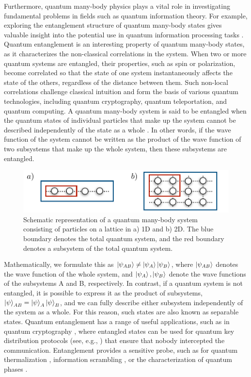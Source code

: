 Furthermore, quantum many-body physics plays a vital role in investigating fundamental problems in fields such as quantum information theory. For example, exploring the entanglement structure of quantum many-body states gives valuable insight into the potential use in quantum information processing tasks \cite{luecke2014, schmied2016, luo2017}. Quantum entanglement is an interesting property of quantum many-body states, as it characterizes the non-classical correlations in the system. When two or more quantum systems are entangled, their properties, such as spin or polarization, become correlated so that the state of one system instantaneously affects the state of the others, regardless of the distance between them. Such non-local correlations challenge classical intuition and form the basis of various quantum technologies, including quantum cryptography, quantum teleportation, and quantum computing. A quantum many-body system is said to be entangled when the quantum states of individual particles that make up the system cannot be described independently of the state as a whole \cite{nielsen2000}. In other words, if the wave function of the system cannot be written as the product of the wave function of two subsystems that make up the whole system, then these subsystems are entangled. 

\begin{figure}[ht]
    \centering
    \includegraphics[width=\textwidth]{Chapters/Plots/Chapter1/Chapter0_Fig2.pdf}
    \caption{Schematic representation of a quantum many-body system consisting of particles on a lattice in a) 1D and b) 2D. The blue boundary denotes the total quantum system, and the red boundary denotes a subsystem of the total quantum system.} 
    \label{fig:Chapter0_Fig2}
\end{figure}

Mathematically, we formulate this as $\ket{\psi_{AB}} \neq \ket{\psi_A} \ket{\psi_B}$, where $\ket{\psi_{AB}}$ denotes the wave function of the whole system, and $\ket{\psi_A}, \ket{\psi_B}$ denote the wave functions of the subsystems A and B, respectively. In contrast, if a quantum system is not entangled, it is possible to express it as the product of subsystems, $\ket{\psi}_{AB} = \ket{\psi}_A \ket{\psi}_B$, and we can fully describe either subsystem independently of the system as a whole. For this reason, such states are also known as separable states. Quantum entanglement has a range of useful applications, such as in quantum cryptography \cite{pirandola2020}, where entangled states can be used for quantum key distribution protocols (see, e.g., \cite{ekert1991}) that ensure that nobody intercepted the communication. Entanglement provides a sensitive probe, such as for quantum thermalization \cite{deutsch1991,rigol2008,dalessio2016}, information scrambling \cite{srednicki1994,trail2008,bentsen2019}, or the characterization of quantum phases \cite{calabrese2004}.

